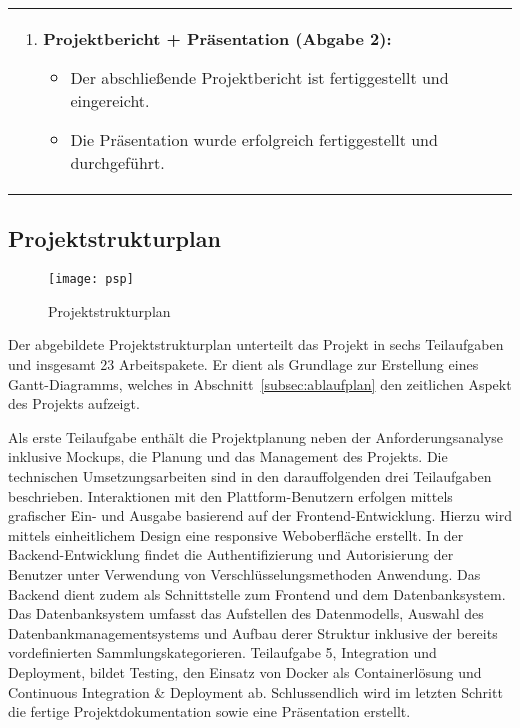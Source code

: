 \begin{tabularx}{\textwidth}{L R}
\begin{enumerate}[left=0pt,label=\arabic*.,itemsep=0.4cm]
            \item \textbf{Projektbericht + Präsentation (Abgabe 2):}
            \begin{itemize}[leftmargin=*]
                \item Der abschließende Projektbericht ist fertiggestellt und eingereicht.
                \item Die Präsentation wurde erfolgreich fertiggestellt und durchgeführt.
            \end{itemize}
        \end{enumerate}
    \end{tabularx}

\newpage

\subsection{Projektstrukturplan}\label{subsec:projektstrukturplan}

\begin{figure}[H]
    \centering
    \texttt{[image: psp]}
    \caption{Projektstrukturplan}\label{fig:projektstrukturplan}
\end{figure}

Der abgebildete Projektstrukturplan unterteilt das Projekt in sechs Teilaufgaben und insgesamt 23 Arbeitspakete.
Er dient als Grundlage zur Erstellung eines Gantt-Diagramms, welches in Abschnitt~\ref{subsec:ablaufplan} den zeitlichen Aspekt des Projekts aufzeigt.

Als erste Teilaufgabe enthält die Projektplanung neben der Anforderungsanalyse inklusive Mockups, die Planung und das Management des Projekts.
Die technischen Umsetzungsarbeiten sind in den darauffolgenden drei Teilaufgaben beschrieben.
Interaktionen mit den Plattform-Benutzern erfolgen mittels grafischer Ein- und Ausgabe basierend auf der Frontend-Entwicklung.
Hierzu wird mittels einheitlichem Design eine responsive Weboberfläche erstellt.
In der Backend-Entwicklung findet die Authentifizierung und Autorisierung der Benutzer unter Verwendung von Verschlüsselungsmethoden Anwendung.
Das Backend dient zudem als Schnittstelle zum Frontend und dem Datenbanksystem.
Das Datenbanksystem umfasst das Aufstellen des Datenmodells, Auswahl des Datenbankmanagementsystems und Aufbau derer Struktur inklusive der bereits vordefinierten Sammlungskategorieren.
Teilaufgabe 5, Integration und Deployment, bildet Testing, den Einsatz von Docker als Containerlösung und Continuous Integration \& Deployment ab.
Schlussendlich wird im letzten Schritt die fertige Projektdokumentation sowie eine Präsentation erstellt.


